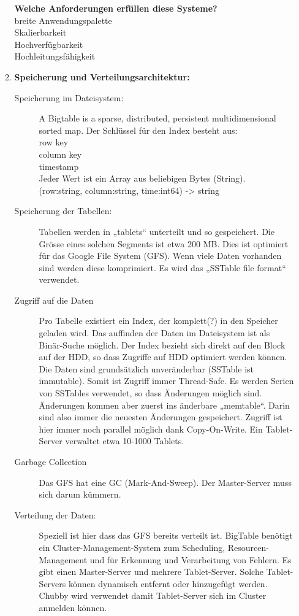 \documentclass[a4paper,10pt,titlepage=false]{scrreprt}
\begin{document}
\begin{itemize}
\begin{enumerate}
\textbf{Welche Anforderungen erfüllen diese Systeme?} \\
breite Anwendungspalette\\
Skalierbarkeit\\
Hochverfügbarkeit\\
Hochleitungsfähigkeit\\
\item \textbf{Speicherung und Verteilungsarchitektur:}\\
\begin{description}
  \item[Speicherung im Dateisystem:] A Bigtable is a sparse, distributed, persistent multidimensional sorted map.
Der Schlüssel für den Index besteht aus:\\
row key\\
column key\\
timestamp\\
Jeder Wert ist ein Array aus beliebigen Bytes (String).\\
(row:string, column:string, time:int64) -> string 
\item [Speicherung der Tabellen:]Tabellen werden in „tablets“ unterteilt und so gespeichert. Die Grösse eines solchen Segments ist etwa 200 MB. Dies ist optimiert für das Google File System (GFS). Wenn viele Daten vorhanden sind werden diese komprimiert. Es wird das „SSTable file format“ verwendet.
\item[Zugriff auf die Daten]Pro Tabelle existiert ein Index, der komplett(?) in den Speicher geladen wird. Das auffinden der Daten im Dateisystem ist als Binär-Suche möglich. Der Index bezieht sich direkt auf den Block auf der HDD, so dass Zugriffe auf HDD optimiert werden können.
Die Daten sind grundsätzlich unveränderbar (SSTable ist immutable). Somit ist Zugriff immer Thread-Safe. Es werden Serien von SSTables verwendet, so dass Änderungen möglich sind. Änderungen kommen aber zuerst ins änderbare „memtable“. Darin sind also immer die neuesten Änderungen gespeichert. Zugriff ist hier immer noch parallel möglich dank Copy-On-Write.
Ein Tablet-Server verwaltet etwa 10-1000 Tablets.
\item[Garbage Collection]Das GFS hat eine GC (Mark-And-Sweep). Der Master-Server muss sich darum kümmern.
\item[Verteilung der Daten:] Speziell ist hier dass das GFS bereits verteilt ist. BigTable benötigt ein Cluster-Management-System zum Scheduling, Resourcen-Management und für Erkennung und Verarbeitung von Fehlern. 
Es gibt einen Master-Server und mehrere Tablet-Server. Solche Tablet-Servers können dynamisch entfernt oder hinzugefügt werden. Chubby wird verwendet damit Tablet-Server sich im Cluster anmelden können.

\end{description}
\end{enumerate}
\end{itemize}
\end{document}
